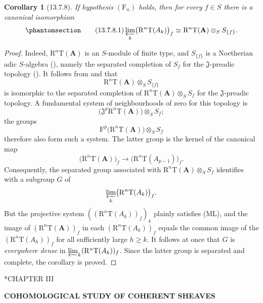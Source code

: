 \documentclass[oneside]{amsart}
\makeatletter
\theoremstyle{ega-env-style}
\theoremstyle{ega-thm-env-style}
\newtheorem*{corollary}{Corollary}
\theoremstyle{ega-defn-env-style}
\def\section{\@startsection{section}{1}%
  \z@{.7\linespacing\@plus\linespacing}{.5\linespacing}%
  {\normalfont\bfseries\Large\scshape\centering}}
\def\bb{\mathbf}                    %
\def\geq{\geqslant}                 %
\def\RR{\mathrm{R}}                 %
\def\isoto{\simeq} %
\newcommand{\oldpage}[2][]{{\marginnote{\normalfont{\textbf{#1}~|~#2}}}\ignorespaces}
\let\EGAOriginalLabel\label
\renewcommand{\label}[1]{\phantomsection\EGAOriginalLabel{#1}}
\makeatother
\begin{document}
\begin{corollary}[13.7.8]
\label{0.13.7.8}
If hypothesis $(\mathrm{F}_n)$ holds, then for every $f\in S$ there
is a canonical isomorphism
\begin{equation}
\label{0.13.7.8.1}
\tag{13.7.8.1}
  \varprojlim_k\bigl(\RR^n\mathrm{T}(A_k)\bigr)_f
  \isoto
  \RR^n\mathrm{T}(\bb{A})\otimes_S S_{\{f\}}.
\end{equation}
\end{corollary}

\begin{proof}
Indeed, $\RR^n\mathrm{T}(\bb{A})$ is an $S$-module of finite type,
and $S_{\{f\}}$ is a Noetherian adic $S$-algebra
(), namely the separated
completion of $S_f$ for the $\mathfrak{J}$-preadic topology
().
It follows from  and
 that
\[
  \RR^n\mathrm{T}(\bb{A})\otimes_S S_{\{f\}}
\]
is isomorphic to the separated completion of
$\RR^n\mathrm{T}(\bb{A})\otimes_S S_f$ for the
$\mathfrak{J}$-preadic topology.
A fundamental system of neighbourhoods of zero for this topology
is
\[
  \bigl(
    \mathfrak{J}^p\RR^n\mathrm{T}(\bb{A})
  \bigr)\otimes_S S_f;
\]
the groups
\[
  \mathrm{F}^p\bigl(\RR^n\mathrm{T}(\bb{A})\bigr)
  \otimes_S S_f
\]
therefore also form such a system.
The latter group is the kernel of the canonical map
\[
  \bigl(\RR^n\mathrm{T}(\bb{A})\bigr)_f
  \longrightarrow
  \bigl(\RR^n\mathrm{T}(A_{p-1})\bigr)_f.
\]
Consequently, the separated group associated with
$\RR^n\mathrm{T}(\bb{A})\otimes_S S_f$ identifies with a subgroup
$G$ of
\[
  \varprojlim_k\bigl(\RR^n\mathrm{T}(A_k)\bigr)_f.
\]
But the projective system
$((\RR^n\mathrm{T}(A_k))_f)_k$ plainly satisfies {\rm(ML)}, and the
image of $(\RR^n\mathrm{T}(\bb{A}))_f$ in each
$(\RR^n\mathrm{T}(A_k))_f$ equals the common image of the
$(\RR^n\mathrm{T}(A_h))_f$ for all sufficiently large $h\geq k$.
It follows at once that $G$ is \emph{everywhere dense} in
$\varprojlim_k(\RR^n\mathrm{T}(A_k))_f$.
Since the latter group is separated and complete, the corollary is
proved.
\end{proof}

\clearpage
{}
\label{section:ega3}
\section*{CHAPTER III}
\setcounter{section}{0}
\setcounter{subsection}{0}
\setcounter{equation}{0}
\begin{center}
\Large\bfseries COHOMOLOGICAL STUDY OF COHERENT SHEAVES
\end{center}
\oldpage[III]{81}
\end{document}
